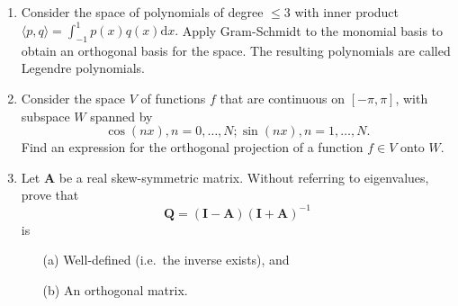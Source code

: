 \documentclass[11pt,fleqn]{article}
\begin{document}
\begin{enumerate}
\item Consider the space of polynomials of degree $\le 3$ with inner product $\langle p,q\rangle = \int_{-1}^1p(x)q(x)\mathrm{d}x.$ Apply Gram-Schmidt to the monomial basis to obtain an orthogonal basis for the space. The resulting polynomials are called Legendre polynomials.
\item Consider the space $V$ of functions $f$ that are continuous on $[-\pi,\pi]$, with subspace $W$ spanned by
\[\cos(nx),n=0,\ldots,N;\sin(nx),n=1,\ldots,N.\]
Find an expression for the orthogonal projection of a function $f\in V$ onto $W$.
\item Let $\mathbf{A}$ be a real skew-symmetric matrix. Without referring to eigenvalues, prove that
\[\mathbf{Q} = (\mathbf{I}-\mathbf{A})(\mathbf{I}+\mathbf{A})^{-1}\]
is
	\begin{itemize}
	\item[(a)] Well-defined (i.e.\ the inverse exists), and
	\item[(b)] An orthogonal matrix.
	\end{itemize}
\end{enumerate}
 
\end{document}
